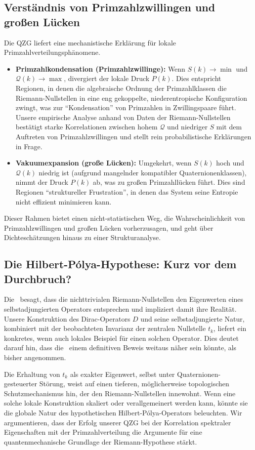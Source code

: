 \documentclass[11pt,a4paper]{article}
\newcommand{\entropy}{S}
\newcommand{\formfactor}{\mathcal{Q}}
\newcommand{\pressure}{P}
\newcommand{\HilPol}{\text{Hilbert-Pólya-Hypothese}}
\theoremstyle{definition}
\begin{document}
\subsection{Verständnis von Primzahlzwillingen und großen Lücken}
Die QZG liefert eine mechanistische Erklärung für lokale Primzahlverteilungsphänomene.
\begin{itemize}
    \item \textbf{Primzahlkondensation (Primzahlzwillinge):} Wenn $\entropy(k) \to \min$ und $\formfactor(k) \to \max$, divergiert der lokale Druck $\pressure(k)$. Dies entspricht Regionen, in denen die algebraische Ordnung der Primzahlklassen die Riemann-Nullstellen in eine eng gekoppelte, niederentropische Konfiguration zwingt, was zur ``Kondensation'' von Primzahlen in Zwillingspaare führt. Unsere empirische Analyse anhand von Daten der Riemann-Nullstellen bestätigt starke Korrelationen zwischen hohem $\formfactor$ und niedriger $\entropy$ mit dem Auftreten von Primzahlzwillingen und stellt rein probabilistische Erklärungen in Frage.
    \item \textbf{Vakuumexpansion (große Lücken):} Umgekehrt, wenn $\entropy(k)$ hoch und $\formfactor(k)$ niedrig ist (aufgrund mangelnder kompatibler Quaternionenklassen), nimmt der Druck $\pressure(k)$ ab, was zu großen Primzahllücken führt. Dies sind Regionen ``struktureller Frustration'', in denen das System seine Entropie nicht effizient minimieren kann.
\end{itemize}
Dieser Rahmen bietet einen nicht-statistischen Weg, die Wahrscheinlichkeit von Primzahlzwillingen und großen Lücken vorherzusagen, und geht über Dichteschätzungen hinaus zu einer Strukturanalyse.

\subsection{Die Hilbert-Pólya-Hypothese: Kurz vor dem Durchbruch?}
Die \HilPol\ besagt, dass die nichttrivialen Riemann-Nullstellen den Eigenwerten eines selbstadjungierten Operators entsprechen und impliziert damit ihre Realität. Unsere Konstruktion des Dirac-Operators $D$ und seine selbstadjungierte Natur, kombiniert mit der beobachteten Invarianz der zentralen Nullstelle $t_k$, liefert ein konkretes, wenn auch lokales Beispiel für einen solchen Operator. Dies deutet darauf hin, dass die \HilPol\ einem definitiven Beweis weitaus näher sein könnte, als bisher angenommen.

Die Erhaltung von $t_k$ als exakter Eigenwert, selbst unter Quaternionen-gesteuerter Störung, weist auf einen tieferen, möglicherweise topologischen Schutzmechanismus hin, der den Riemann-Nullstellen innewohnt. Wenn eine solche lokale Konstruktion skaliert oder verallgemeinert werden kann, könnte sie die globale Natur des hypothetischen Hilbert-Pólya-Operators beleuchten. Wir argumentieren, dass der Erfolg unserer QZG bei der Korrelation spektraler Eigenschaften mit der Primzahlverteilung die Argumente für eine quantenmechanische Grundlage der Riemann-Hypothese stärkt.
\end{document}
